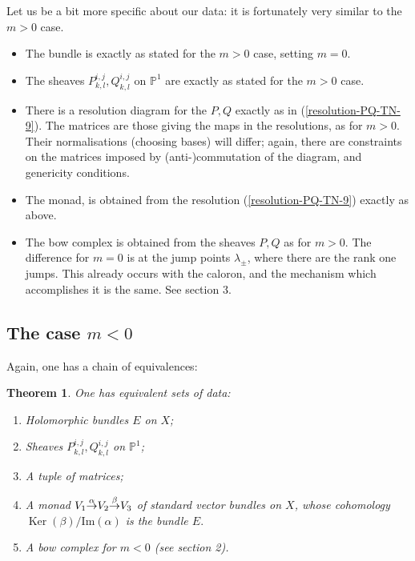 \documentclass[12pt]{article}
\newtheorem{theorem}{Theorem}[section]
\theoremstyle{definition}
\theoremstyle{remark}
\numberwithin{theorem}{section}
\def\bP{{\mathbb {P}}}
\renewcommand{\ker}{\mathop{\mathrm{Ker}}\nolimits}
\begin{document}
  Let us  be a bit more specific about our data:  it is  fortunately  
very similar to the  $m>0$ case. 
\begin{itemize}
\item The bundle is exactly as stated for the $m>0$ case, setting $m=0$.
\item The   sheaves $P^{i,j}_{k,l}, Q^{i,j}_{k,l}$ on $\bP^1$ are exactly as stated for the $m>0$ case.
\item There is a resolution diagram for the $P,Q$ exactly as in (\ref{resolution-PQ-TN-9}).  The  matrices are those giving the maps in the resolutions,  as for $m>0$.  Their normalisations (choosing bases) will differ; again, there are constraints on the matrices imposed by (anti-)commutation of the diagram, and genericity conditions.
\item The monad, is obtained from the resolution (\ref{resolution-PQ-TN-9}) exactly as above.
\item The bow complex is obtained from the  sheaves $P,Q$ as for $m>0$. The difference for $m=0$ is at the jump points $\lambda_\pm$, where there are the rank one jumps. This already occurs with the caloron, and the mechanism which accomplishes it is the same. See section 3.
\end{itemize}


 \subsection{The case $m<0$}

Again, one has  a chain of equivalences:

\begin{theorem} One has equivalent sets of  data:
\begin{enumerate}
\item Holomorphic bundles $E$ on $X$;
\item Sheaves $P^{i,j}_{k,l}, Q^{i,j}_{k,l}$ on $\bP^1$;
\item  A tuple of matrices;
\item  A monad $ V_1 {\buildrel{\alpha }\over{\rightarrow} }V_2 {\buildrel{\beta}\over{\rightarrow}}  V_3$ of standard vector bundles on $X$, whose cohomology $\ker( \beta)/\mathrm{Im}(\alpha)$ is the bundle $E.$
\item A bow complex for $m<0$ (see section 2).
\end{enumerate}

\end{theorem}
\end{document}
